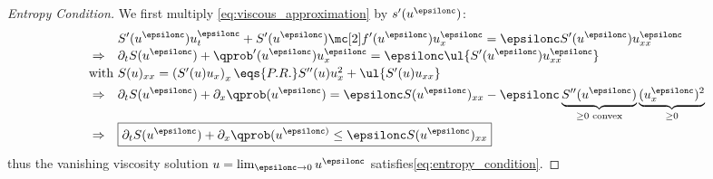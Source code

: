 \begin{proofbox}\nospacing
    \begin{proof}[Entropy Condition]\label{proof:defn:entropy_condition}
        We first multiply \cref{eq:viscous_approximation} by $s'(u^{\epsilonc})$:
        \begin{align}
          &&&S'(u^{\epsilonc})u_{t}^{\epsilonc}+S'(u^{\epsilonc})\flux'(u^{\epsilonc})u_{x}^{\epsilonc}=\epsilonc S'(u^{\epsilonc})u_{xx}^{\epsilonc}\nonumber\\[-1\jot]
          &\Rightarrow&&
          \partial_{t}S(u^{\epsilonc})+\qprob'(u^{\epsilonc})u_{x}^{\epsilonc}=\epsilonc\ul{S'(u^{\epsilonc})u_{xx}^{\epsilonc}}\nonumber\\[-1\jot]
          \intertext{with $S(u)_{xx}=\left(S'(u)u_{x}\right)_{x}\eqs{P.R.}S''(u)u_{x}^{2}+\ul{S'(u)u_{xx}}$}
          &\Rightarrow&&\partial_{t}S(u^{\epsilonc})+\partial_{x}\qprob(u^{\epsilonc})=\epsilonc S(u^{\epsilonc})_{xx}-\epsilonc\underbrace{S''(u^{\epsilonc})}_{\geq0\text{ convex}}\underbrace{(u_{x}^{\epsilonc})^{2}}_{\geq0}\nonumber\\[-1\jot]
          &\Rightarrow&&\boxed{\partial_{t}S(u^{\epsilonc})+\partial_{x}\qprob(u^{\epsilonc)}\leq\epsilonc S(u^{\epsilonc})_{xx}}\label{eq:entropy_condition_derivation}
        \end{align}
        thus the vanishing viscosity solution $u=\lim_{\epsilonc\to0}u^{\epsilonc}$ satisfies\cref{eq:entropy_condition}.
    \end{proof}
\end{proofbox}
